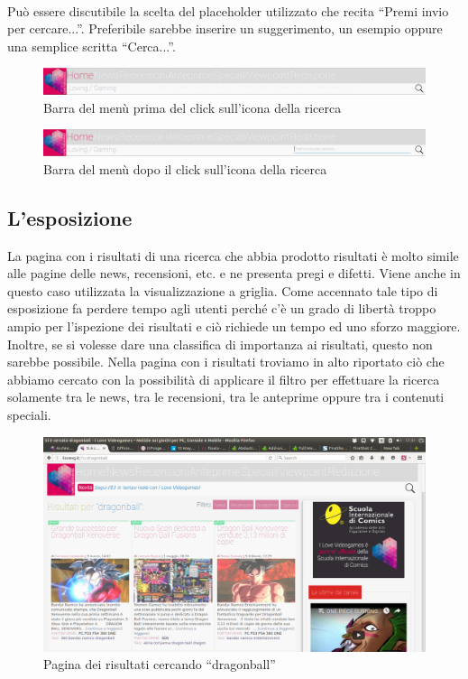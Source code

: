 \documentclass[../ProgettoTecWeb2.tex]{subfiles}
\begin{document}
	\paragraph{}
	Può essere discutibile la scelta del placeholder utilizzato che recita ``Premi invio per cercare...''. Preferibile sarebbe inserire un suggerimento, un esempio oppure una semplice scritta ``Cerca...''.
	\begin{figure} [H]
		\centering
		\includegraphics[scale=0.3]{img/BarraMenuILoveVg}
		\caption{Barra del menù prima del click sull'icona della ricerca}
	\end{figure}
	\begin{figure} [H]
		\centering
		\includegraphics[scale=0.3]{img/BarraMenuILoveVgDopoClick}
		\caption{Barra del menù dopo il click sull'icona della ricerca}
	\end{figure}

	\subsection{L'esposizione}
	La pagina con i risultati di una ricerca che abbia prodotto risultati è molto simile alle pagine delle news, recensioni, etc. e ne presenta pregi e difetti. 
	Viene anche in questo caso utilizzata la visualizzazione a griglia. Come accennato tale tipo di esposizione fa perdere tempo agli utenti perché c'è un grado di libertà troppo ampio per l'ispezione dei risultati e ciò richiede un tempo ed uno sforzo maggiore. Inoltre, se si volesse dare una classifica di importanza ai risultati, questo non sarebbe possibile.
	Nella pagina con i risultati troviamo in alto riportato ciò che abbiamo cercato con la possibilità di applicare il filtro per effettuare la ricerca solamente tra le news, tra le recensioni, tra le anteprime oppure tra i contenuti speciali.
	\begin{figure} [H]
		\centering
		\includegraphics[scale=0.2]{img/RicercaConRisultati}
		\caption{Pagina dei risultati cercando ``dragonball''}
	\end{figure}
\end{document}
